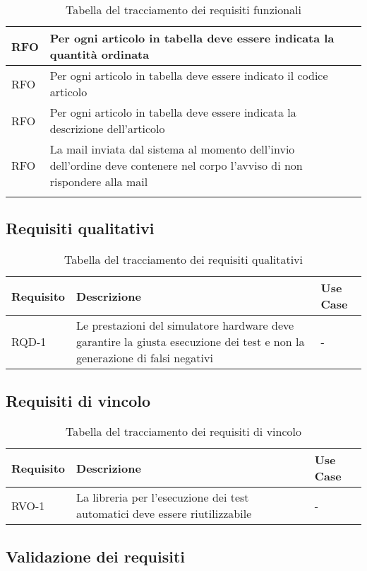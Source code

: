\begin{center}
\begin{longtable}{ | >{\centering\arraybackslash}m{2.5cm} | >{\centering\arraybackslash}m{8cm} | >{\centering\arraybackslash}m{2.5cm} | }
RFO & Per ogni articolo in tabella deve essere indicata la quantità ordinata & \\ \hline
RFO & Per ogni articolo in tabella deve essere indicato il codice articolo & \\ \hline
RFO & Per ogni articolo in tabella deve essere indicata la descrizione dell'articolo & \\ \hline
RFO & La mail inviata dal sistema al momento dell'invio dell'ordine deve contenere nel corpo l'avviso di non rispondere alla mail & \\
\hline
\caption{Tabella del tracciamento dei requisiti funzionali}
\end{longtable}
\end{center}

\subsection{Requisiti qualitativi}

\begin{table}%
\caption{Tabella del tracciamento dei requisiti qualitativi}
\label{tab:requisiti-qualitativi}
\begin{tabularx}{\textwidth}{lXl}
\hline\hline
\textbf{Requisito} & \textbf{Descrizione} & \textbf{Use Case}\\
\hline
RQD-1    & Le prestazioni del simulatore hardware deve garantire la giusta esecuzione dei test e non la generazione di falsi negativi & - \\
\hline
\end{tabularx}
\end{table}%

\subsection{Requisiti di vincolo}

\begin{table}%
\caption{Tabella del tracciamento dei requisiti di vincolo}
\label{tab:requisiti-vincolo}
\begin{tabularx}{\textwidth}{lXl}
\hline\hline
\textbf{Requisito} & \textbf{Descrizione} & \textbf{Use Case}\\
\hline
RVO-1    & La libreria per l'esecuzione dei test automatici deve essere riutilizzabile & - \\
\hline
\end{tabularx}
\end{table}%

\subsection{Validazione dei requisiti}